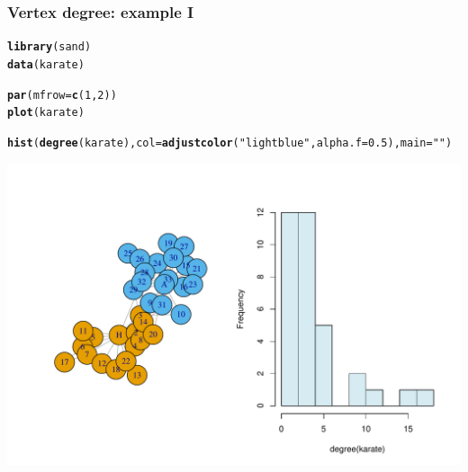 \documentclass{beamer}\usepackage[]{graphicx}\usepackage[]{color}
\makeatletter
\newcommand{\hlnum}[1]{\textcolor[rgb]{0.686,0.059,0.569}{#1}}%
\newcommand{\hlstr}[1]{\textcolor[rgb]{0.192,0.494,0.8}{#1}}%
\newcommand{\hlstd}[1]{\textcolor[rgb]{0.345,0.345,0.345}{#1}}%
\newcommand{\hlkwc}[1]{\textcolor[rgb]{0.333,0.667,0.333}{#1}}%
\newcommand{\hlkwd}[1]{\textcolor[rgb]{0.737,0.353,0.396}{\textbf{#1}}}%
\newenvironment{kframe}{%
 \def\at@end@of@kframe{}%
 \ifinner\ifhmode%
  \def\at@end@of@kframe{\end{minipage}}%
  \begin{minipage}{\columnwidth}%
 \fi\fi%
 \def\FrameCommand##1{\hskip\@totalleftmargin \hskip-\fboxsep
 \colorbox{shadecolor}{##1}\hskip-\fboxsep
     \hskip-\linewidth \hskip-\@totalleftmargin \hskip\columnwidth}%
 \MakeFramed {\advance\hsize-\width
   \@totalleftmargin\z@ \linewidth\hsize
   \@setminipage}}%
 {\par\unskip\endMakeFramed%
 \at@end@of@kframe}
\newenvironment{knitrout}{}{} %
\makeatother
\begin{document}
\begin{frame}
  \frametitle{Vertex degree: example I}

\begin{knitrout}\scriptsize
{}\color{fgcolor}\begin{kframe}
\begin{alltt}
\hlkwd{library}\hlstd{(sand)}
\hlkwd{data}\hlstd{(karate)}

\hlkwd{par}\hlstd{(}\hlkwc{mfrow}\hlstd{=}\hlkwd{c}\hlstd{(}\hlnum{1}\hlstd{,}\hlnum{2}\hlstd{))}
\hlkwd{plot}\hlstd{(karate)}

\hlkwd{hist}\hlstd{(}\hlkwd{degree}\hlstd{(karate),} \hlkwc{col}\hlstd{=}\hlkwd{adjustcolor}\hlstd{(}\hlstr{"lightblue"}\hlstd{,} \hlkwc{alpha.f} \hlstd{=} \hlnum{0.5}\hlstd{),} \hlkwc{main}\hlstd{=}\hlstr{""}\hlstd{)}
\end{alltt}
\end{kframe}
\includegraphics[width=.8\textwidth]{figures/degree_1-1} 

\end{knitrout}
      
\end{frame}
\end{document}
